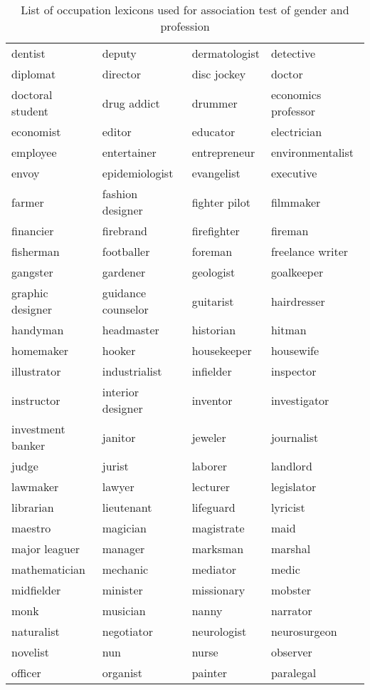 \documentclass[11pt]{article}
\begin{document}
\begin{table}[t]
\begin{adjustbox}{height=4.2in}
\begin{tabular}{l l l l}
        dentist & deputy & dermatologist & detective \\
        diplomat & director & disc jockey & doctor \\
        doctoral student & drug addict & drummer & economics professor \\
        economist & editor & educator & electrician \\
        employee & entertainer & entrepreneur & environmentalist \\
        envoy & epidemiologist & evangelist & executive \\
        farmer & fashion designer & fighter pilot & filmmaker \\
        financier & firebrand & firefighter & fireman \\
        fisherman & footballer & foreman & freelance writer \\
        gangster & gardener & geologist & goalkeeper \\
        graphic designer & guidance counselor & guitarist & hairdresser \\
        handyman & headmaster & historian & hitman \\
        homemaker & hooker & housekeeper & housewife \\
        illustrator & industrialist & infielder & inspector \\
        instructor & interior designer & inventor & investigator \\
        investment banker & janitor & jeweler & journalist \\
        judge & jurist & laborer & landlord \\
        lawmaker & lawyer & lecturer & legislator \\
        librarian & lieutenant & lifeguard & lyricist \\
        maestro & magician & magistrate & maid \\
        major leaguer & manager & marksman & marshal \\
        mathematician & mechanic & mediator & medic \\
        midfielder & minister & missionary & mobster \\
        monk & musician & nanny & narrator \\
        naturalist & negotiator & neurologist & neurosurgeon \\
        novelist & nun & nurse & observer \\
        officer & organist & painter & paralegal \\
        
    \bottomrule
    \end{tabular}
    \end{adjustbox}
    \caption{List of occupation lexicons used for association test of gender and profession}
    \label{tab:occ1}
\end{table}
\end{document}
